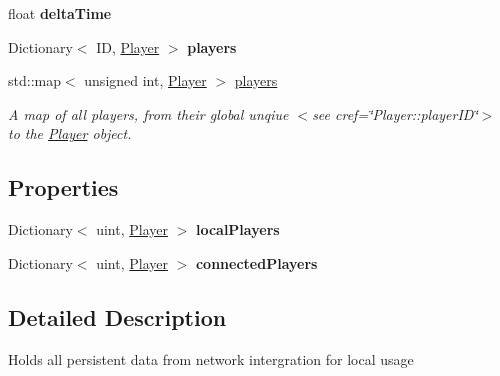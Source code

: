 \begin{DoxyCompactItemize}
\item 
\hypertarget{class_game_state_a857eed8c97274c3dd9d3eb558a33f855}{float {\bfseries delta\-Time}}\label{class_game_state_a857eed8c97274c3dd9d3eb558a33f855}

\item 
\hypertarget{class_game_state_aed9c4cf83c497c6e36585e0ed3999564}{Dictionary$<$ I\-D, \hyperlink{class_game_state_1_1_player}{Player} $>$ {\bfseries players}}\label{class_game_state_aed9c4cf83c497c6e36585e0ed3999564}

\item 
\hypertarget{class_game_state_a8f156a6cce5f2b9945c274b6bfc971ce}{std\-::map$<$ unsigned int, \hyperlink{class_game_state_1_1_player}{Player} $>$ \hyperlink{class_game_state_a8f156a6cce5f2b9945c274b6bfc971ce}{players}}\label{class_game_state_a8f156a6cce5f2b9945c274b6bfc971ce}

\begin{DoxyCompactList}\small\item\em A map of all players, from their global unqiue $<$see cref=\char`\"{}\-Player\-::player\-I\-D\char`\"{}$>$ to the \hyperlink{class_game_state_1_1_player}{Player} object. \end{DoxyCompactList}\end{DoxyCompactItemize}
\subsection*{Properties}
\begin{DoxyCompactItemize}
\item 
\hypertarget{class_game_state_a3fe38a9e11fe72dd4bc4796e1d4a6c1b}{Dictionary$<$ uint, \hyperlink{class_game_state_1_1_player}{Player} $>$ {\bfseries local\-Players}}\label{class_game_state_a3fe38a9e11fe72dd4bc4796e1d4a6c1b}

\item 
\hypertarget{class_game_state_ad0f225ac26f38bf21be10d35a1cd6011}{Dictionary$<$ uint, \hyperlink{class_game_state_1_1_player}{Player} $>$ {\bfseries connected\-Players}}\label{class_game_state_ad0f225ac26f38bf21be10d35a1cd6011}

\end{DoxyCompactItemize}


\subsection{Detailed Description}
Holds all persistent data from network intergration for local usage 

